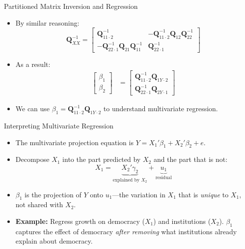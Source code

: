 \documentclass[aspectratio=169]{beamer}
\numberwithin{equation}{section}
\begin{document}
\begin{frame}{Partitioned Matrix Inversion and Regression}
\begin{itemize}
\item By similar reasoning:
$$\bm{Q}_{XX}^{-1}=\begin{bmatrix} \mathbf{Q}_{11\cdot 2}^{-1} &-\mathbf{Q}_{11\cdot 2}^{-1}\mathbf{Q}_{12}\mathbf{Q}_{22}^{-1}\\ -\mathbf{Q}_{22\cdot 1}^{-1}\mathbf{Q}_{21}\mathbf{Q}_{11}^{-1}&\mathbf{Q}_{22\cdot 1}^{-1}\end{bmatrix}$$
\item As a result:
\begin{align*}
\begin{bmatrix}\beta_1\\\beta_2\end{bmatrix}&=\begin{bmatrix} \mathbf{Q}_{11\cdot 2}^{-1} \mathbf{Q}_{1Y\cdot 2}\\ \mathbf{Q}_{22\cdot 1}^{-1} \mathbf{Q}_{2Y\cdot 1} \end{bmatrix}
\end{align*}
\item We can use $\beta_1=\mathbf{Q}_{11\cdot 2}^{-1} \mathbf{Q}_{1Y\cdot 2}$ to understand multivariate regression.
\end{itemize}
\end{frame}

\begin{frame}{Interpreting Multivariate Regression}
\begin{itemize}
\item The multivariate projection equation is $Y=X_1'\beta_1+X_2'\beta_2+e$.
\item Decompose $X_1$ into the part predicted by $X_2$ and the part that is not:
$$X_1 = \underbrace{X_2'\gamma_2}_{\text{explained by }X_2} + \underbrace{u_1}_{\text{residual}}$$
\pause
\item $\beta_1$ is the projection of $Y$ onto $u_1$---the variation in $X_1$ that is \emph{unique} to $X_1$, not shared with $X_2$.
\pause
\item \textbf{Example:} Regress growth on democracy ($X_1$) and institutions ($X_2$).  $\beta_1$ captures the effect of democracy \emph{after removing} what institutions already explain about democracy.
\end{itemize}
\end{frame}
\end{document}
